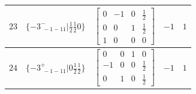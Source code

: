 \documentclass[fleqn,8pt]{jsarticle}
\begin{document}
\begin{longtable}{ccccc}
$ 23 $ & $ \{-3^{-}_{\,\,-1-11}|\frac{1}{2} \frac{1}{2} 0\} $ & $ \begin{bmatrix} 0 & -1 & 0 & \frac{1}{2} \\ 0 & 0 & 1 & \frac{1}{2} \\ 1 & 0 & 0 & 0 \end{bmatrix} $ & $ -1 $ & $ 1 $ \\ \hline
$ 24 $ & $ \{-3^{+}_{\,\,-1-11}|0 \frac{1}{2} \frac{1}{2}\} $ & $ \begin{bmatrix} 0 & 0 & 1 & 0 \\ -1 & 0 & 0 & \frac{1}{2} \\ 0 & 1 & 0 & \frac{1}{2} \end{bmatrix} $ & $ -1 $ & $ 1 $ \\
\end{longtable}
\end{document}
